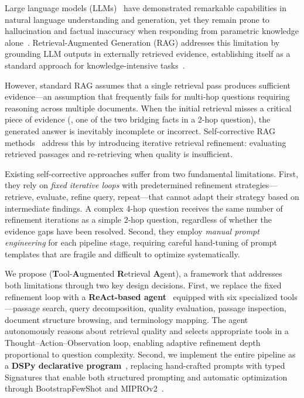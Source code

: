 
Large language models (LLMs)~\cite{vaswani2017attention,ouyang2022instructgpt,openai2023gpt4,touvron2023llama} have demonstrated remarkable capabilities in natural language understanding and generation, yet they remain prone to hallucination and factual inaccuracy when responding from parametric knowledge alone~\cite{huang2025hallucination}.
Retrieval-Augmented Generation (RAG) addresses this limitation by grounding LLM outputs in externally retrieved evidence, establishing itself as a standard approach for knowledge-intensive tasks~\cite{lewis2020rag,gao2024ragsurvey,yang2025llmkb}.

However, standard RAG assumes that a single retrieval pass produces sufficient evidence---an assumption that frequently fails for multi-hop questions requiring reasoning across multiple documents.
When the initial retrieval misses a critical piece of evidence (\eg, one of the two bridging facts in a 2-hop question), the generated answer is inevitably incomplete or incorrect.
Self-corrective RAG methods~\cite{yan2024crag,asai2024selfrag} address this by introducing iterative retrieval refinement: evaluating retrieved passages and re-retrieving when quality is insufficient.

Existing self-corrective approaches suffer from two fundamental limitations.
First, they rely on \emph{fixed iterative loops} with predetermined refinement strategies---retrieve, evaluate, refine query, repeat---that cannot adapt their strategy based on intermediate findings.
A complex 4-hop question receives the same number of refinement iterations as a simple 2-hop question, regardless of whether the evidence gaps have been resolved.
Second, they employ \emph{manual prompt engineering} for each pipeline stage, requiring careful hand-tuning of prompt templates that are fragile and difficult to optimize systematically.

We propose \ours{} (\textbf{T}ool-\textbf{A}ugmented \textbf{R}etrieval \textbf{A}gent), a framework that addresses both limitations through two key design decisions.
First, we replace the fixed refinement loop with a \textbf{ReAct-based agent}~\cite{yao2023react} equipped with six specialized tools---passage search, query decomposition, quality evaluation, passage inspection, document structure browsing, and terminology mapping.
The agent autonomously reasons about retrieval quality and selects appropriate tools in a Thought--Action--Observation loop, enabling adaptive refinement depth proportional to question complexity.
Second, we implement the entire pipeline as a \textbf{DSPy declarative program}~\cite{khattab2024dspy}, replacing hand-crafted prompts with typed Signatures that enable both structured prompting and automatic optimization through BootstrapFewShot and MIPROv2~\cite{opsahl2024miprov2}.

